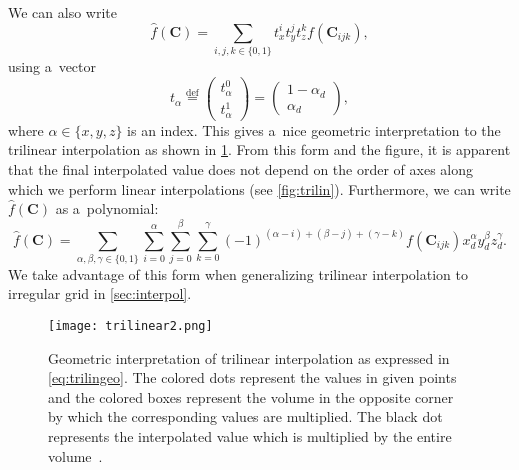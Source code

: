 				\noindent We can also write
					\begin{equation}
						\label{eq:trilingeo}
						\widehat{f}(\mathbf{C}) = \sum_{i,j,k \in \{0,1\}} t_x^i t_y^j t_z^k f(\mathbf{C}_{ijk}),
					\end{equation}
				using a~vector
					\begin{equation}
						t_\alpha \stackrel{\text{def}}{=} \begin{pmatrix}t_\alpha^0\\ t_\alpha^1\end{pmatrix} = \begin{pmatrix}1-\alpha_d\\ \alpha_d\end{pmatrix},
					\end{equation}
				where $\alpha \in \{x,y,z\}$ is an index. This gives a~nice geometric interpretation to the trilinear interpolation as shown in \cref{fig:trilin2}. From this form and the figure, it is apparent that the final interpolated value does not depend on the order of axes along which we perform linear interpolations (see \cref{fig:trilin}). Furthermore, we can write $\widehat{f}(\mathbf{C})$ as a~polynomial:
					\begin{equation}
						\label{eq:trilinpoly}
						\widehat{f}(\mathbf{C}) = \sum_{\alpha,\beta,\gamma \in \{0,1\}}\sum^{\alpha}_{i=0}\sum^{\beta}_{j=0}\sum^{\gamma}_{k=0} 	(-1)^{(\alpha-i)+(\beta-j)+(\gamma-k)} f(\mathbf{C}_{ijk}) x_d^\alpha y_d^\beta z_d^\gamma.
					\end{equation}
				We take advantage of this form when generalizing trilinear interpolation to irregular grid in \cref{sec:interpol}.
					
				\begin{figure}
					\centering
					\texttt{[image: trilinear2.png]}
					\caption{Geometric interpretation of trilinear interpolation as expressed in \cref{eq:trilingeo}. The colored dots represent the values in given points and the colored boxes represent the volume in the opposite corner by which the corresponding values are multiplied. The black dot represents the interpolated value which is multiplied by the entire volume~\cite{trilinear}.}
					\label{fig:trilin2}
				\end{figure}